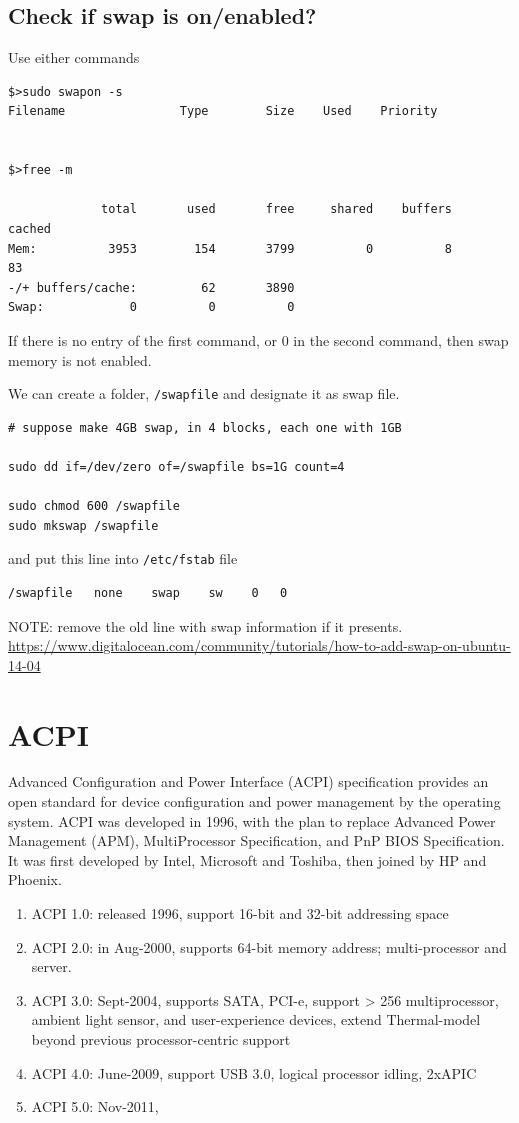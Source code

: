 \subsection{Check if swap is on/enabled?}

Use either commands
\begin{verbatim}
$>sudo swapon -s
Filename                Type        Size    Used    Priority


$>free -m

             total       used       free     shared    buffers     cached
Mem:          3953        154       3799          0          8         83
-/+ buffers/cache:         62       3890
Swap:            0          0          0
\end{verbatim}
If there is no entry of the first command, or 0 in the second command, then swap
memory is not enabled.

We can create a folder, \verb!/swapfile! and designate it as swap file.
\begin{verbatim}
# suppose make 4GB swap, in 4 blocks, each one with 1GB

sudo dd if=/dev/zero of=/swapfile bs=1G count=4

sudo chmod 600 /swapfile
sudo mkswap /swapfile

\end{verbatim}
and put this line into \verb!/etc/fstab! file
\begin{verbatim}
/swapfile   none    swap    sw    0   0
\end{verbatim}
NOTE: remove the old line with swap information if it presents.
\url{https://www.digitalocean.com/community/tutorials/how-to-add-swap-on-ubuntu-14-04}


\section{ACPI}
\label{sec:ACPI}


Advanced Configuration and Power Interface (ACPI) specification provides an
open standard for device configuration and power management by the operating system.
ACPI was developed in 1996, with the plan to replace Advanced Power
Management (APM), MultiProcessor Specification, and PnP BIOS Specification. It
was first developed by Intel, Microsoft and Toshiba, then joined by HP and
Phoenix. 
\begin{enumerate}
  \item ACPI 1.0: released 1996, support 16-bit and 32-bit addressing space
  \item ACPI 2.0: in Aug-2000, supports 64-bit memory address; multi-processor
  and server.
  \item ACPI 3.0: Sept-2004, supports SATA, PCI-e, support > 256 multiprocessor,
  ambient light sensor, and user-experience devices, extend Thermal-model beyond
  previous processor-centric support
  
  \item ACPI 4.0: June-2009, support USB 3.0, logical processor idling, 2xAPIC
  \item ACPI 5.0: Nov-2011, 
\end{enumerate}

